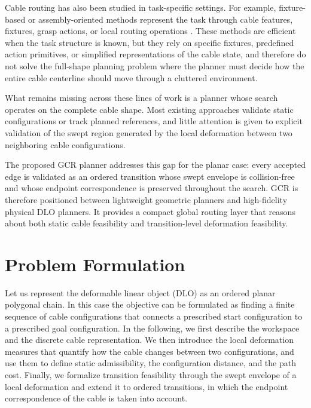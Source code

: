 \documentclass{pas}
\begin{document}
Cable routing has also been studied in task-specific settings. For example,
fixture-based or assembly-oriented methods represent the task through cable
features, fixtures, grasp actions, or local routing operations
\citep{jin2022robotic,waltersson2022planning,keipour2022deformable}.
These methods are efficient when the task structure is known, but they rely on
specific fixtures, predefined action primitives, or simplified representations
of the cable state, and therefore do not solve the full-shape planning problem
where the planner must decide how the entire cable centerline should move
through a cluttered environment.

What remains missing across these lines of work is a planner whose search
operates on the complete cable shape. Most existing
approaches validate static configurations or track planned references, and
little attention is given to explicit validation of the swept region generated
by the local deformation between two neighboring cable configurations.

The proposed GCR planner addresses this gap for the planar case: every accepted
edge is validated as an ordered transition whose swept envelope is
collision-free and whose endpoint correspondence is preserved throughout the
search. GCR is therefore positioned between lightweight geometric planners and
high-fidelity physical DLO planners. It provides a compact global routing layer that reasons about both static cable feasibility and transition-level deformation feasibility.




\section{Problem Formulation}
\label{sec:formulation}

Let us represent the deformable linear object (DLO) as an ordered planar polygonal chain. In this case the objective can be formulated as finding a finite sequence of cable configurations that connects a prescribed start configuration to a prescribed goal configuration. In the following, we first describe the workspace and the discrete cable representation. We then introduce the local deformation measures that quantify how the cable changes between two configurations, and use them to define static admissibility, the configuration distance, and the path cost. Finally, we formalize transition feasibility through the swept envelope of a local deformation and extend it to ordered transitions, in which the endpoint correspondence of the cable is taken into account.
\end{document}
